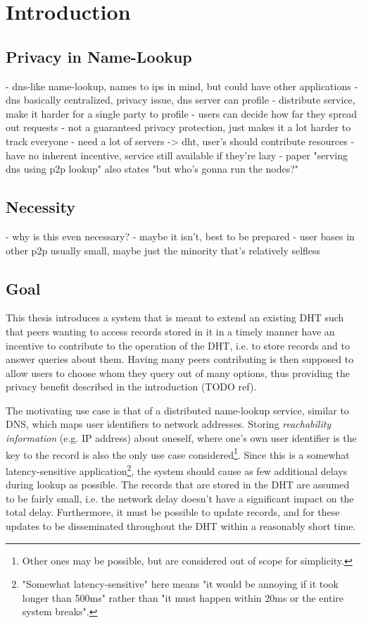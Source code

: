 \chapter{Introduction}
\section{Privacy in Name-Lookup}
- dns-like name-lookup, names to ips in mind, but could have other applications
- dns basically centralized, privacy issue, dns server can profile
- distribute service, make it harder for a single party to profile
- users can decide how far they spread out requests
- not a guaranteed privacy protection, just makes it a lot harder to track
  everyone
- need a lot of servers -> dht, user's should contribute resources
- have no inherent incentive, service still available if they're lazy
- paper "serving dns using p2p lookup" also states "but who's gonna run the
  nodes?"

\section{Necessity}
- why is this even necessary?
- maybe it isn't, best to be prepared
- user bases in other p2p usually small, maybe just the minority that's
  relatively selfless

\section{Goal}
This thesis introduces a system that is meant to extend an existing \ac{DHT}
such that peers wanting to access records stored in it in a timely manner have
an incentive to contribute to the operation of the \ac{DHT}, i.e. to store
records and to answer queries about them. Having many peers contributing is then
supposed to allow users to choose whom they query out of many options, thus
providing the privacy benefit described in the introduction (TODO ref).

The motivating use case is that of a distributed name-lookup service, similar to
DNS, which maps user identifiers to network addresses. Storing
\emph{reachability information} (e.g. IP address) about oneself, where one's own
user identifier is the key to the record is also the only use case
considered\footnote{Other ones may be possible, but are considered out of scope
for simplicity.}. Since this is a somewhat latency-sensitive
application\footnote{"Somewhat latency-sensitive" here means "it would be
annoying if it took longer than 500ms" rather than "it must happen within 20ms
or the entire system breaks".}, the system should cause as few additional delays
during lookup as possible. The records that are stored in the \ac{DHT} are
assumed to be fairly small, i.e. the network delay doesn't have a significant
impact on the total delay. Furthermore, it must be possible to update records,
and for these updates to be disseminated throughout the \ac{DHT} within a
reasonably short time.

